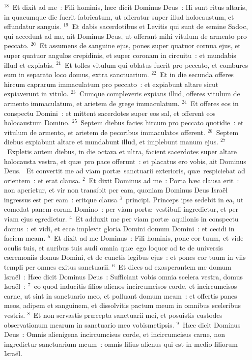 ${}^{18}$~Et dixit ad me~: Fili hominis, h\ae c dicit Dominus Deus~: Hi sunt ritus altaris, in quacumque die fuerit fabricatum, ut offeratur super illud holocaustum, et effundatur sanguis.
${}^{19}$~Et dabis sacerdotibus et Levitis qui sunt de semine Sadoc, qui accedunt ad me, ait Dominus Deus, ut offerant mihi vitulum de armento pro peccato.
${}^{20}$~Et assumens de sanguine ejus, pones super quatuor cornua ejus, et super quatuor angulos crepidinis, et super coronam in circuitu~: et mundabis illud et expiabis.
${}^{21}$~Et tolles vitulum qui oblatus fuerit pro peccato, et combures eum in separato loco domus, extra sanctuarium.
${}^{22}$~Et in die secunda offeres hircum caprarum immaculatum pro peccato~: et expiabunt altare sicut expiaverunt in vitulo.
${}^{23}$~Cumque compleveris expians illud, offeres vitulum de armento immaculatum, et arietem de grege immaculatum.
${}^{24}$~Et offeres eos in conspectu Domini~: et mittent sacerdotes super eos sal, et offerent eos holocaustum Domino.
${}^{25}$~Septem diebus facies hircum pro peccato quotidie~: et vitulum de armento, et arietem de pecoribus immaculatos offerent.
${}^{26}$~Septem diebus expiabunt altare et mundabunt illud, et implebunt manum ejus.
${}^{27}$~Expletis autem diebus, in die octava et ultra, facient sacerdotes super altare holocausta vestra, et qu\ae\ pro pace offerunt~: et placatus ero vobis, ait Dominus Deus.
~Et convertit me ad viam port\ae\ sanctuarii exterioris, qu\ae\ respiciebat ad orientem~: et erat clausa.
${}^{2}$~Et dixit Dominus ad me~: Porta h\ae c clausa erit~: non aperietur, et vir non transibit per eam, quoniam Dominus Deus Isra\"el ingressus est per eam~: eritque clausa
${}^{3}$~principi. Princeps ipse sedebit in ea, ut comedat panem coram Domino~: per viam port\ae\ vestibuli ingredietur, et per viam ejus egredietur.
${}^{4}$~Et adduxit me per viam port\ae\ aquilonis in conspectu domus~: et vidi, et ecce implevit gloria Domini domum Domini~: et cecidi in faciem meam.
${}^{5}$~Et dixit ad me Dominus~: Fili hominis, pone cor tuum, et vide oculis tuis, et auribus tuis audi omnia qu\ae\ ego loquor ad te de universis c\ae remoniis domus Domini, et de cunctis legibus ejus~: et pones cor tuum in viis templi per omnes exitus sanctuarii.
${}^{6}$~Et dices ad exasperantem me domum Isra\"el~: H\ae c dicit Dominus Deus~: Sufficiant vobis omnia scelera vestra, domus Isra\"el~:
${}^{7}$~eo quod inducitis filios alienos incircumcisos corde, et incircumcisos carne, ut sint in sanctuario meo, et polluant domum meam~: et offertis panes meos, adipem et sanguinem, et dissolvitis pactum meum in omnibus sceleribus vestris.
${}^{8}$~Et non servastis pr\ae cepta sanctuarii mei, et posuistis custodes observationum mearum in sanctuario meo vobismetipsis.
${}^{9}$~H\ae c dicit Dominus Deus~: Omnis alienigena incircumcisus corde, et incircumcisus carne, non ingredietur sanctuarium meum~: omnis filius alienus qui est in medio filiorum Isra\"el.


